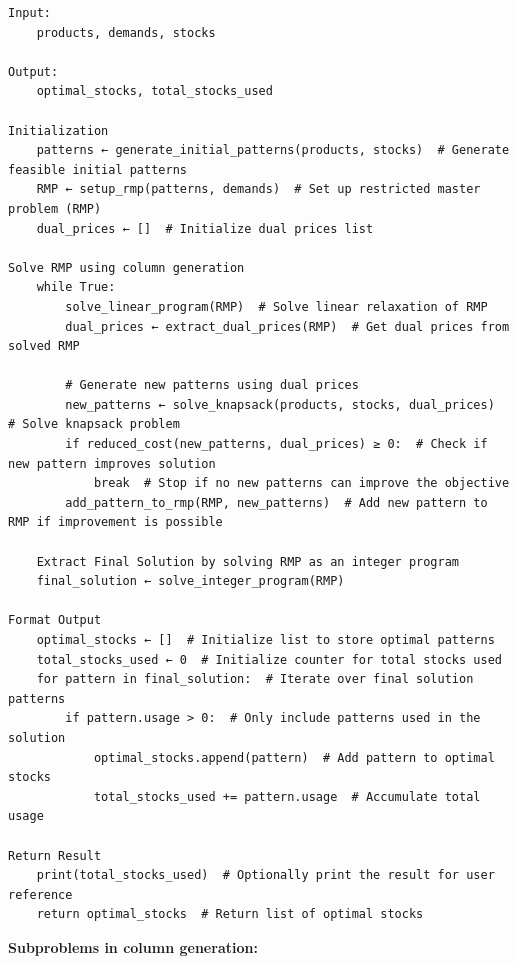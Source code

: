 \documentclass[a4paper]{article}
\begin{document}
\begin{verbatim}
Input:
    products, demands, stocks

Output:
    optimal_stocks, total_stocks_used

Initialization
    patterns ← generate_initial_patterns(products, stocks)  # Generate feasible initial patterns
    RMP ← setup_rmp(patterns, demands)  # Set up restricted master problem (RMP)
    dual_prices ← []  # Initialize dual prices list

Solve RMP using column generation
    while True:
        solve_linear_program(RMP)  # Solve linear relaxation of RMP
        dual_prices ← extract_dual_prices(RMP)  # Get dual prices from solved RMP
    
        # Generate new patterns using dual prices
        new_patterns ← solve_knapsack(products, stocks, dual_prices)  # Solve knapsack problem
        if reduced_cost(new_patterns, dual_prices) ≥ 0:  # Check if new pattern improves solution
            break  # Stop if no new patterns can improve the objective
        add_pattern_to_rmp(RMP, new_patterns)  # Add new pattern to RMP if improvement is possible
    
    Extract Final Solution by solving RMP as an integer program
    final_solution ← solve_integer_program(RMP)

Format Output
    optimal_stocks ← []  # Initialize list to store optimal patterns
    total_stocks_used ← 0  # Initialize counter for total stocks used
    for pattern in final_solution:  # Iterate over final solution patterns
        if pattern.usage > 0:  # Only include patterns used in the solution
            optimal_stocks.append(pattern)  # Add pattern to optimal stocks
            total_stocks_used += pattern.usage  # Accumulate total usage

Return Result
    print(total_stocks_used)  # Optionally print the result for user reference
    return optimal_stocks  # Return list of optimal stocks
\end{verbatim}
\noindent\textbf{Subproblems in column generation:} 
\end{document}
